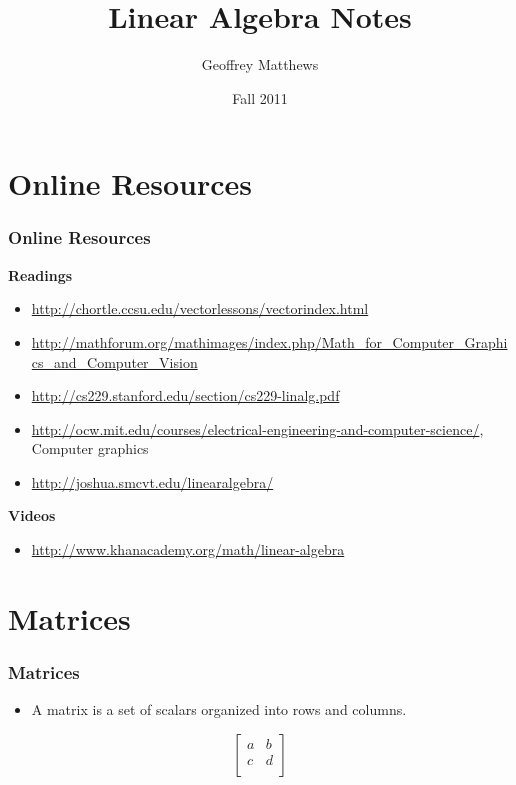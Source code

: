 \documentclass[]{beamer}
\title[Linear Algebra Notes I]
{
Linear Algebra Notes
}
\author[Geoffrey Matthews]
{Geoffrey Matthews}
\institute[WWU/CS]
{
  Department of Computer Science\\
  Western Washington University
}
\date{Fall 2011}
\newcommand{\myref}[1]{\small\item\url{#1}}
\newcommand{\myreff}[1]{\scriptsize\item\url{#1}}
\newcommand{\sect}[1]{
\section{#1}
\begin{frame}[fragile]\frametitle{#1}
}
\begin{document}
\begin{frame}
  \titlepage
\end{frame}



\sect{Online Resources}

{\bf Readings}
\begin{itemize}
  \myref{http://chortle.ccsu.edu/vectorlessons/vectorindex.html}
  \myref{http://mathforum.org/mathimages/index.php/Math_for_Computer_Graphics_and_Computer_Vision}
\myref{http://cs229.stanford.edu/section/cs229-linalg.pdf}

\myreff{http://ocw.mit.edu/courses/electrical-engineering-and-computer-science/}, Computer graphics
\myref{http://joshua.smcvt.edu/linearalgebra/}
\end{itemize}
{\bf Videos}
\begin{itemize}
\myref{http://www.khanacademy.org/math/linear-algebra}
\end{itemize}
\end{frame}

\sect{Matrices}
\begin{itemize}
\item A matrix is a set of scalars organized into rows and columns.
\end{itemize}
\[
\left[\begin{array}{cc}
a & b \\
c & d \\
\end{array}
\right]
\]

\end{frame}
\end{document}
